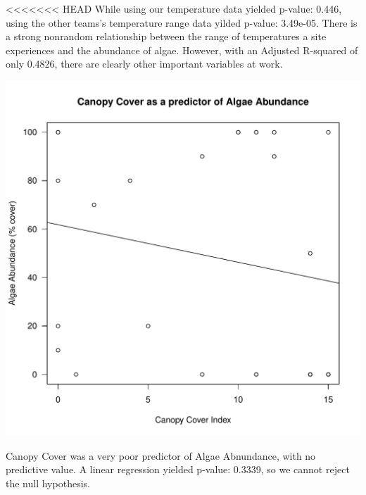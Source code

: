 \documentclass{article}
\begin{document}
<<<<<<< HEAD
While using our temperature data yielded p-value: 0.446, using the other teams's temperature range data yilded p-value: 3.49e-05. There is a strong nonrandom relationship between the range of temperatures a site experiences and the abundance of algae. However, with an Adjusted R-squared of only 0.4826, there are clearly other important variables at work. 
\begin{knitrout}
\color{fgcolor}
\includegraphics[width=\maxwidth]{figure/unnamed-chunk-4-1} 

\end{knitrout}
Canopy Cover was a very poor predictor of Algae Abnundance, with no predictive value. A linear regression yielded p-value: 0.3339, so we cannot reject the null hypothesis.
\end{document}
